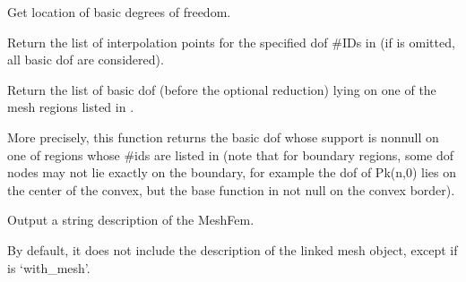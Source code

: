 \documentclass[a4paper,11pt,english]{sphinxmanual}
\begin{document}
\begin{fulllineitems}
\begin{fulllineitems}
\label{\detokenize{python/cmdref_MeshFem:getfem.MeshFem.basic_dof_nodes}}
Get location of basic degrees of freedom.

Return the list of interpolation points for the specified
dof \#IDs in  (if  is omitted, all basic dof are
considered).

\end{fulllineitems}


\begin{fulllineitems}
\label{\detokenize{python/cmdref_MeshFem:getfem.MeshFem.basic_dof_on_region}}
Return the list of basic dof (before the optional reduction) lying on one
of the mesh regions listed in .

More precisely, this function returns the basic dof whose support is
non\sphinxhyphen{}null on one of regions whose \#ids are listed in  (note
that for boundary regions, some dof nodes may not lie exactly
on the boundary, for example the dof of Pk(n,0) lies on the center
of the convex, but the base function in not null on the convex
border).

\end{fulllineitems}


\begin{fulllineitems}
\label{\detokenize{python/cmdref_MeshFem:getfem.MeshFem.char}}
Output a string description of the MeshFem.

By default, it does not include the description of the linked mesh
object, except if  is ‘with\_mesh’.

\end{fulllineitems}



\end{fulllineitems}
\end{document}
